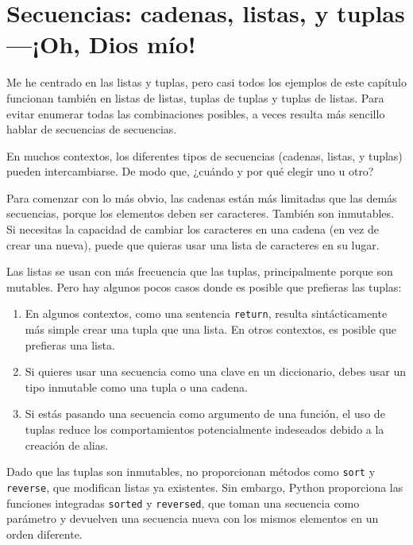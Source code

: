 \section{Secuencias: cadenas, listas, y tuplas---¡Oh, Dios mío!}

Me he centrado en las listas y tuplas, pero casi todos los ejemplos de
este capítulo funcionan también en listas de listas, tuplas de tuplas y
tuplas de listas. Para evitar enumerar todas las combinaciones posibles,
a veces resulta más sencillo hablar de secuencias de secuencias.

En muchos contextos, los diferentes tipos de secuencias (cadenas, listas, y
tuplas) pueden intercambiarse. De modo que, ¿cuándo y por qué elegir uno
u otro?


Para comenzar con lo más obvio, las cadenas están más limitadas que las demás
secuencias, porque los elementos deben ser caracteres. También son
inmutables. Si necesitas la capacidad de cambiar los caracteres
en una cadena (en vez de crear una nueva), puede que
quieras usar una lista de caracteres en su lugar.

Las listas se usan con más frecuencia que las tuplas, principalmente porque son mutables.
Pero hay algunos pocos casos donde es posible que prefieras las tuplas:

\begin{enumerate}

\item En algunos contextos, como una sentencia {\tt return}, resulta
sintácticamente más simple crear una tupla que una lista. En otros
contextos, es posible que prefieras una lista.

\item Si quieres usar una secuencia como una clave en un diccionario,
debes usar un tipo inmutable como una tupla o una cadena.

\item Si estás pasando una secuencia como argumento de una función,
el uso de tuplas reduce los comportamientos potencialmente indeseados
debido a la creación de alias.

\end{enumerate}

Dado que las tuplas son inmutables, no proporcionan métodos
como {\tt sort} y {\tt reverse}, que modifican listas ya existentes.
Sin embargo, Python proporciona las funciones integradas {\tt sorted}
y {\tt reversed}, que toman una secuencia como parámetro
y devuelven una secuencia nueva con los mismos elementos en un
orden diferente.

